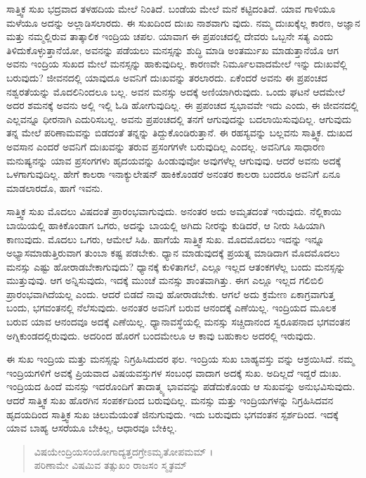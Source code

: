 ಸಾತ್ತ್ವಿಕ ಸುಖ ಭದ್ರವಾದ ತಳಹದಿಯ ಮೇಲೆ ನಿಂತಿದೆ. ಬಂಡೆಯ ಮೇಲೆ ಮನೆ ಕಟ್ಟಿದಂತಿದೆ. ಯಾವ ಗಾಳಿಯೂ ಮಳೆಯೂ ಅದನ್ನು ಅಲ್ಲಾಡಿಸಲಾರದು. ಈ ಸುಖದಿಂದ ದುಃಖ ನಾಶವಾಗು ವುದು. ನಮ್ಮ ದುಃಖಕ್ಕೆಲ್ಲ ಕಾರಣ, ಅಜ್ಞಾನ ಮತ್ತು ನಮ್ಮಲ್ಲಿರುವ ತಾತ್ಕಾಲಿಕ ಇಂದ್ರಿಯ ಚಪಲ. ಯಾವಾಗ ಈ ಪ್ರಪಂಚದಲ್ಲಿ ದೇವರು ಒಬ್ಬನೇ ಸತ್ಯ ಎಂದು ತಿಳಿದುಕೊಳ್ಳುತ್ತಾನೆಯೋ, ಅವನನ್ನು ಪಡೆಯಲು ಮನಸ್ಸನ್ನು ಶುದ್ಧಿ ಮಾಡಿ ಅಂತರ್ಮುಖ ಮಾಡುತ್ತಾನೆಯೊ ಆಗ ಅವನು ಇಂದ್ರಿಯ ಸುಖದ ಮೇಲೆ ಮನಸ್ಸನ್ನು ಹಾಕುವುದಿಲ್ಲ. ಕಾರಣವೇ ನಿರ್ಮೂಲವಾದಮೇಲೆ ಇನ್ನು ದುಃಖವೆಲ್ಲಿ ಬರುವುದು? ಜೀವನದಲ್ಲಿ ಯಾವುದೂ ಅವನಿಗೆ ದುಃಖವನ್ನು ತರಲಾರದು. ಏಕೆಂದರೆ ಅವನು ಈ ಪ್ರಪಂಚದ ನಶ್ವರತೆಯನ್ನು ಮೊದಲಿನಿಂದಲೂ ಬಲ್ಲ. ಅವನ ಮನಸ್ಸು ಅದಕ್ಕೆ ಅಣಿಯಾಗಿರುವುದು. ಒಂದು ಘಟನೆ ಆದಮೇಲೆ ಅದರ ಶಮನಕ್ಕೆ ಅವನು ಅಲ್ಲಿ ಇಲ್ಲಿ ಓಡಿ ಹೋಗುವುದಿಲ್ಲ. ಈ ಪ್ರಪಂಚದ ಸ್ವಭಾವವೇ ಇದು ಎಂದು, ಈ ಜೀವನದಲ್ಲಿ ಎಲ್ಲವನ್ನೂ ಧೀರನಾಗಿ ಎದುರಿಸಬಲ್ಲ. ಅವನು ಪ್ರಪಂಚದಲ್ಲಿ ತನಗೆ ಆಗುವುದನ್ನು ಬದಲಾಯಿಸುವುದಿಲ್ಲ. ಆಗುವುದು ತನ್ನ ಮೇಲೆ ಪರಿಣಾಮವನ್ನು ಬಿಡದಂತೆ ತನ್ನನ್ನು ತಿದ್ದುಕೊಂಡಿರುತ್ತಾನೆ. ಈ ರಹಸ್ಯವನ್ನು ಬಲ್ಲವನು ಸಾತ್ತ್ವಿಕ. ದುಃಖದ ಅವಸಾನ ಎಂದರೆ ಅವನಿಗೆ ದುಃಖವನ್ನು ತರುವ ಪ್ರಸಂಗಗಳೇ ಬರುವುದಿಲ್ಲ ಎಂದಲ್ಲ. ಅವನಿಗೂ ಸಾಧಾರಣ ಮನುಷ್ಯನನ್ನು ಯಾವ ಪ್ರಸಂಗಗಳು ಹೃದಯವನ್ನು ಹಿಂಡುವುವೋ ಅವುಗಳೆಲ್ಲ ಆಗುವುವು. ಆದರೆ ಅವನು ಅದಕ್ಕೆ ಒಳಗಾಗುವುದಿಲ್ಲ. ಹೇಗೆ ಕಾಲರಾ ಇನಾಕ್ಯುಲೇಷನ್ ಹಾಕಿಕೊಂಡರೆ ಅನಂತರ ಕಾಲರಾ ಬಂದರೂ ಅವನಿಗೆ ಏನೂ ಮಾಡಲಾರದೊ, ಹಾಗೆ ಇವನು.

ಸಾತ್ತ್ವಿಕ ಸುಖ ಮೊದಲು ವಿಷದಂತೆ ಪ್ರಾರಂಭವಾಗುವುದು. ಅನಂತರ ಅದು ಅಮೃತದಂತೆ ಇರುವುದು. ನೆಲ್ಲಿಕಾಯಿ ಬಾಯಿಯಲ್ಲಿ ಹಾಕಿಕೊಂಡಾಗ ಒಗರು, ಅದನ್ನು ಬಾಯಲ್ಲಿ ಅಗಿದು ನೀರನ್ನು ಕುಡಿದರೆ, ಆ ನೀರು ಸಿಹಿಯಾಗಿ ಕಾಣುವುದು. ಮೊದಲು ಒಗರು, ಆಮೇಲೆ ಸಿಹಿ. ಹಾಗೆಯೆ ಸಾತ್ತ್ವಿಕ ಸುಖ. ಮೊದಮೊದಲು ಇದನ್ನು ಇನ್ನೂ ಅಭ್ಯಾಸಮಾಡುತ್ತಿರುವಾಗ ತುಂಬಾ ಕಷ್ಟ ಪಡಬೇಕು. ಧ್ಯಾನ ಮಾಡುವುದಕ್ಕೆ ಪ್ರಯತ್ನ ಮಾಡಿದಾಗ ಮೊದಮೊದಲು ಮನಸ್ಸು ಎಷ್ಟು ಹೋರಾಡಬೇಕಾಗುವುದು? ಧ್ಯಾನಕ್ಕೆ ಕುಳಿತಾಗಲೆ, ಎಲ್ಲೂ ಇಲ್ಲದ ಆತಂಕಗಳೆಲ್ಲ ಬಂದು ಮನಸ್ಸನ್ನು ಮುತ್ತುವುವು. ಆಗ ಅನ್ನಿಸುವುದು, ಇದಕ್ಕೆ ಮುಂಚೆ ಮನಸ್ಸು ಶಾಂತವಾಗಿತ್ತು. ಈಗ ಎಲ್ಲೂ ಇಲ್ಲದ ಗಲಿಬಿಲಿ ಪ್ರಾರಂಭವಾಗಿದೆಯಲ್ಲ ಎಂದು. ಆದರೆ ಬಿಡದೆ ನಾವು ಹೋರಾಡಬೇಕು. ಆಗಲೆ ಅದು ಕ್ರಮೇಣ ಏಕಾಗ್ರವಾಗುತ್ತ ಬಂದು, ಭಗವಂತನಲ್ಲಿ ನೆಲೆಸುವುದು. ಅನಂತರ ಅವನಿಗೆ ಬರುವ ಆನಂದಕ್ಕೆ ಎಣೆಯಿಲ್ಲ. ಇಂದ್ರಿಯದ ಮೂಲಕ ಬರುವ ಯಾವ ಆನಂದವೂ ಅದಕ್ಕೆ ಎಣೆಯಿಲ್ಲ. ಧ್ಯಾನಾವಸ್ಥೆಯಲ್ಲಿ ಮನಸ್ಸು ಸಚ್ಚಿದಾನಂದ ಸ್ವರೂಪನಾದ ಭಗವಂತನ ಅಗ್ನಿಕುಂಡದಲ್ಲಿರುವುದು. ಅದರಿಂದ ಹೊರಗೆ ಬಂದಮೇಲೂ ಆ ಕಾವು ಬಹುಕಾಲ ಅದರಲ್ಲಿ ಇರುವುದು.

ಈ ಸುಖ ಇಂದ್ರಿಯ ಮತ್ತು ಮನಸ್ಸನ್ನು ನಿಗ್ರಹಿಸಿದುದರ ಫಲ. ಇಂದ್ರಿಯ ಸುಖ ಬಾಹ್ಯವಸ್ತು ವನ್ನು ಆಶ್ರಯಿಸಿದೆ. ನಮ್ಮ ಇಂದ್ರಿಯಗಳಿಗೆ ಅವಕ್ಕೆ ಪ್ರಿಯವಾದ ವಿಷಯವಸ್ತುಗಳ ಸಂಬಂಧ ವಾದಾಗ ಅದಕ್ಕೆ ಸುಖ. ಅದಿಲ್ಲದೆ ಇದ್ದರೆ ದುಃಖ. ಇಂದ್ರಿಯದ ಹಿಂದೆ ಮನಸ್ಸು ಇದರೊಂದಿಗೆ ತಾದಾತ್ಮ್ಯ ಭಾವವನ್ನು ಪಡೆದುಕೊಂಡು ಆ ಸುಖವನ್ನು ಅನುಭವಿಸುವುದು. ಆದರೆ ಸಾತ್ತ್ವಿಕ ಸುಖ ಹೊರಗಿನ ಸಂಪರ್ಕದಿಂದ ಬರುವುದಿಲ್ಲ. ಮನಸ್ಸು ಮತ್ತು ಇಂದ್ರಿಯಗಳನ್ನು ನಿಗ್ರಹಿಸಿದವನ ಹೃದಯದಿಂದ ಸಾತ್ತ್ವಿಕ ಸುಖ ಚಿಲುಮೆಯಂತೆ ಜಿನುಗುವುದು. ಇದು ಬರುವುದು ಭಗವಂತನ ಸ್ಪರ್ಶದಿಂದ. ಇದಕ್ಕೆ ಯಾವ ಬಾಹ್ಯ ಆಸರೆಯೂ ಬೇಕಿಲ್ಲ, ಆಧಾರವೂ ಬೇಕಿಲ್ಲ.

\begin{verse}
ವಿಷಯೇಂದ್ರಿಯಸಂಯೋಗಾದ್ಯತ್ತದಗ್ರೇಽಮೃತೋಪಮಮ್ ।\\ಪರಿಣಾಮೇ ವಿಷಮಿವ ತತ್ಸುಖಂ ರಾಜಸಂ ಸ್ಮೃತಮ್ 
\end{verse}

